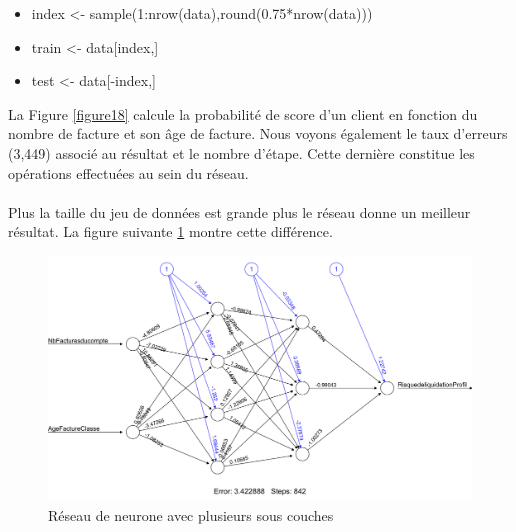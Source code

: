 \documentclass[11pt,a4paper]{report}
\begin{document}
\begin{itemize}
\item index <- sample(1:nrow(data),round(0.75*nrow(data)))
\item train <- data[index,]
\item test <- data[-index,]
\end{itemize}
La Figure \ref{figure18} calcule la probabilité de score d'un client en fonction du nombre de facture et son âge de facture. Nous voyons également le taux d'erreurs (3,449) associé au résultat  et le nombre d'étape. Cette dernière constitue les opérations effectuées au sein du réseau. \\\\
Plus la taille du jeu de données est grande plus le réseau donne un meilleur résultat. La figure suivante \ref{neural2} montre cette différence.
 
\newpage
\begin{figure}[h]
   \includegraphics[scale=0.36]{neural2.png}
     \caption{Réseau de neurone avec plusieurs sous couches}
     \label{neural2}
\end{figure}
\end{document}

